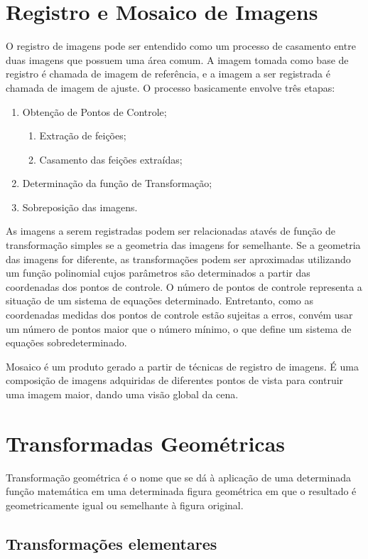 \documentclass[9pt, a4paper, nofonttune, journal]{IEEEtran}
\begin{document}
\section{Registro e Mosaico de Imagens}
O registro de imagens pode ser entendido como um processo de casamento entre duas imagens que possuem uma área comum. A imagem tomada como base de registro é chamada de imagem de referência, e a imagem a ser registrada é chamada de imagem de ajuste. O processo basicamente envolve três etapas:
\begin{enumerate}
	\item Obtenção de Pontos de Controle;
	\begin{enumerate}
		\item Extração de feições;
		\item Casamento das feições extraídas;
	\end{enumerate}
	\item Determinação da função de Transformação;
	\item Sobreposição das imagens.
\end{enumerate}

As imagens a serem registradas podem ser relacionadas atavés de função de transformação simples se a geometria das imagens for semelhante. Se a geometria das imagens for diferente, as transformações podem ser aproximadas utilizando um função polinomial cujos parâmetros são determinados a partir das coordenadas dos pontos de controle. O número de pontos de controle representa a situação de um sistema de equações determinado. Entretanto, como as coordenadas medidas dos pontos de controle estão sujeitas a erros, convém usar um número de pontos maior que o número mínimo, o que define um sistema de equações sobredeterminado.

Mosaico é um produto gerado a partir de técnicas de registro de imagens. É uma composição de imagens adquiridas de diferentes pontos de vista para contruir uma imagem maior, dando uma visão global da cena.

\section{Transformadas Geométricas}
Transformação geométrica é o nome que se dá à aplicação de uma determinada função matemática em uma determinada figura geométrica 
em que o resultado é geometricamente igual ou semelhante à figura original.

\subsection{Transformações elementares}
\end{document}
